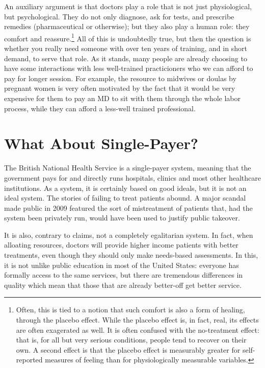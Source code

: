 An auxiliary argument is that doctors play a role that is not just
physiological, but psychological. They do not only diagnose, ask for tests, and
prescribe remedies (pharmaceutical or otherwise); but they also play a human
role: they comfort and reassure.\footnote{Often, this is tied to a notion that
such comfort is also a form of healing, through the placebo effect. While the
placebo effect is, in fact, real, its effects are often exagerated as well. It
is often confused with the no-treatment effect: that is, for all but very
serious conditions, people tend to recover on their own. A second effect is
that the placebo effect is measurably greater for self-reported measures of
feeling than for physiologically measurable variables.} All of this is
undoubtedly true, but then the question is whether you really need someone with
over ten years of training, and in short demand, to serve that role. As it
stands, many people are already choosing to have some interactions with less
well-trained practicioners who we can afford to pay for longer session. For
example, the resource to midwives or doulas by pregnant women is very often
motivated by the fact that it would be very expensive for them to pay an MD to
sit with them through the whole labor process, while they can afford a
less-well trained professional.

\section{What About Single-Payer?}

The British National Health Service is a single-payer system, meaning that the
government pays for and directly runs hospitals, clinics and most other
healthcare institutions. As a system, it is certainly based on good ideals, but
it is not an ideal system. The stories of failing to treat patients abound. A
major scandal made public in 2009 featured the sort of mistreatment of patients
that, had the system been privately run, would have been used to justify public
takeover.

It is also, contrary to claims, not a completely egalitarian system. In fact,
when alloating resources, doctors will provide higher income patients with
better treatments, even though they should only make needs-based
assessments. In this, it is not
unlike public education in most of the United States: everyone has formally
access to the same services, but there are tremendous differences in quality
which mean that those that are already better-off get better service.


